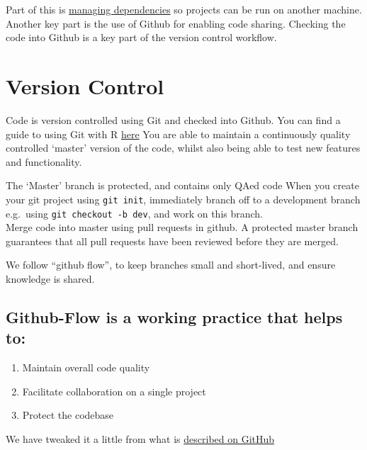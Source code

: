 \documentclass[]{book}
\providecommand{\tightlist}{%
  \setlength{\itemsep}{0pt}\setlength{\parskip}{0pt}}
\begin{document}
Part of this is \protect\hyperlink{projdep}{managing dependencies} so projects can be run on another machine. Another key part is the use of Github for enabling code sharing. Checking the code into Github is a key part of the version control workflow.

\hypertarget{versioncontrol}{%
\section{Version Control}\label{versioncontrol}}

Code is version controlled using Git and checked into Github.
You can find a guide to using Git with R \href{http://happygitwithr.com/}{here}
You are able to maintain a continuously quality controlled `master' version of the code, whilst also being able to test new features and functionality.

The `Master' branch is protected, and contains only QAed code
When you create your git project using \texttt{git\ init}, immediately branch off to a development branch e.g.~using \texttt{git\ checkout\ -b\ dev}, and work on this branch.\\
Merge code into master using pull requests in github. A protected master branch guarantees that all pull requests have been reviewed before they are merged.

We follow ``github flow'', to keep branches small and short-lived, and ensure knowledge is shared.

\hypertarget{github-flow-is-a-working-practice-that-helps-to}{%
\subsection*{Github-Flow is a working practice that helps to:}\label{github-flow-is-a-working-practice-that-helps-to}}

\begin{enumerate}
\def\labelenumi{\arabic{enumi}.}
\tightlist
\item
  Maintain overall code quality\\
\item
  Facilitate collaboration on a single project\\
\item
  Protect the codebase
\end{enumerate}

We have tweaked it a little from what is \href{https://guides.github.com/introduction/flow/}{described on GitHub}
\end{document}
